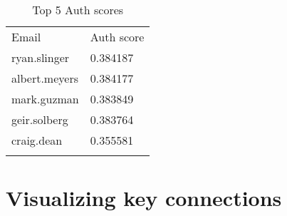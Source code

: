 \documentclass{tufte-handout}
\begin{document}
\begin{longtable}[c]{@{}ll@{}}
\toprule\addlinespace
\begin{minipage}[b]{0.21\columnwidth}\raggedright
Email
\end{minipage} & \begin{minipage}[b]{0.17\columnwidth}\raggedright
Auth score
\end{minipage}
\\\addlinespace
\midrule\endhead
\begin{minipage}[t]{0.21\columnwidth}\raggedright
ryan.slinger
\end{minipage} & \begin{minipage}[t]{0.17\columnwidth}\raggedright
0.384187
\end{minipage}
\\\addlinespace
\begin{minipage}[t]{0.21\columnwidth}\raggedright
albert.meyers
\end{minipage} & \begin{minipage}[t]{0.17\columnwidth}\raggedright
0.384177
\end{minipage}
\\\addlinespace
\begin{minipage}[t]{0.21\columnwidth}\raggedright
mark.guzman
\end{minipage} & \begin{minipage}[t]{0.17\columnwidth}\raggedright
0.383849
\end{minipage}
\\\addlinespace
\begin{minipage}[t]{0.21\columnwidth}\raggedright
geir.solberg
\end{minipage} & \begin{minipage}[t]{0.17\columnwidth}\raggedright
0.383764
\end{minipage}
\\\addlinespace
\begin{minipage}[t]{0.21\columnwidth}\raggedright
craig.dean
\end{minipage} & \begin{minipage}[t]{0.17\columnwidth}\raggedright
0.355581
\end{minipage}
\\\addlinespace
\bottomrule
\addlinespace
\caption{Top 5 Auth scores}
\end{longtable}

\section{Visualizing key connections}\label{visualizing-key-connections}
\end{document}
